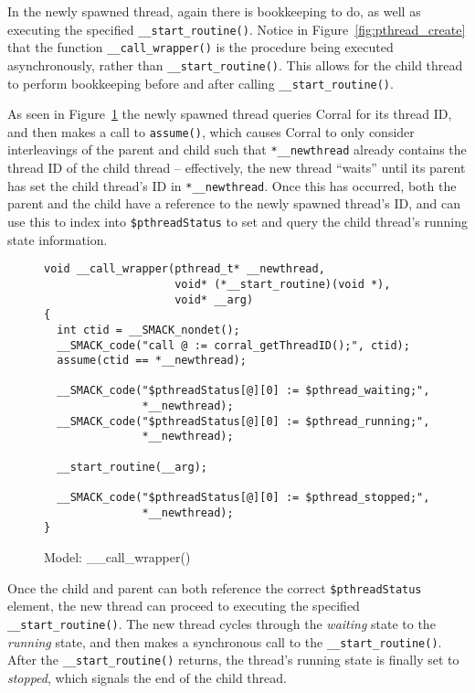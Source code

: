 In the newly spawned thread, again there is bookkeeping to do, as well
as executing the specified \lstinline|__start_routine()|.  Notice in
Figure~\ref{fig:pthread_create} that the function
\lstinline|__call_wrapper()| is the procedure being executed
asynchronously, rather than \lstinline|__start_routine()|.  This
allows for the child thread to perform bookkeeping before and after
calling \lstinline|__start_routine()|.

As seen in Figure~\ref{fig:__call_wrapper} the newly spawned thread
queries Corral for its thread ID, and then makes a call to
\lstinline|assume()|, which causes Corral to only consider
interleavings of the parent and child such that
\lstinline|*__newthread| already contains the thread ID of the child
thread -- effectively, the new thread ``waits'' until its parent has
set the child thread's ID in \lstinline|*__newthread|. Once this has
occurred, both the parent and the child have a reference to the newly
spawned thread's ID, and can use this to index into
\lstinline|$pthreadStatus| to set and query the child thread's running
state information.

\begin{figure}[!ht]
\centering
\begin{lstlisting}
void __call_wrapper(pthread_t* __newthread,
                    void* (*__start_routine)(void *),
                    void* __arg)
{
  int ctid = __SMACK_nondet();
  __SMACK_code("call @ := corral_getThreadID();", ctid);
  assume(ctid == *__newthread);
  
  __SMACK_code("$pthreadStatus[@][0] := $pthread_waiting;",
               *__newthread);
  __SMACK_code("$pthreadStatus[@][0] := $pthread_running;",
               *__newthread);

  __start_routine(__arg);

  __SMACK_code("$pthreadStatus[@][0] := $pthread_stopped;",
               *__newthread);
}
\end{lstlisting}
\caption{Model: \_\_call\_wrapper()}\label{fig:__call_wrapper}
\end{figure}

Once the child and parent can both reference the correct
\lstinline|$pthreadStatus| element, the new thread can proceed to
executing the specified \lstinline|__start_routine()|.  The new thread
cycles through the \emph{waiting} state to the \emph{running} state,
and then makes a synchronous call to the
\lstinline|__start_routine()|.  After the
\lstinline|__start_routine()| returns, the thread's running state is
finally set to \emph{stopped}, which signals the end of the child
thread. 

